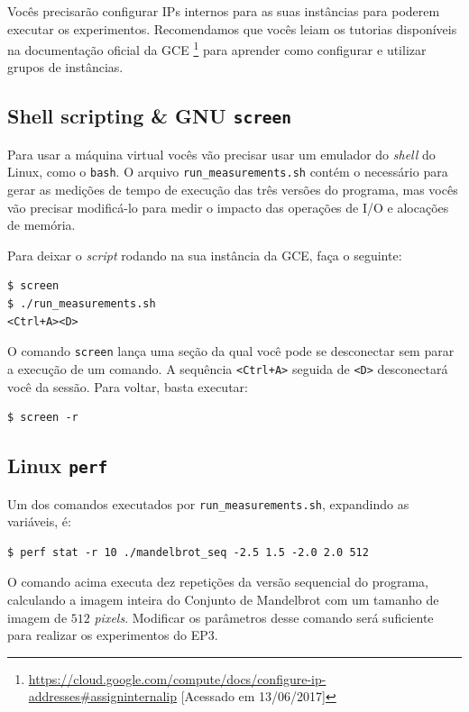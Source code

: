 \documentclass[final,12pt,a4paper]{elsarticle}
\begin{document}
Vocês precisarão configurar IPs internos para as suas instâncias para poderem
executar os experimentos. Recomendamos que vocês leiam os tutorias disponíveis
na documentação oficial da GCE
\footnote{\url{https://cloud.google.com/compute/docs/configure-ip-addresses#assigninternalip}
[Acessado em 13/06/2017]} para aprender como configurar e utilizar grupos de
instâncias.

\subsection{Shell scripting \& GNU \texttt{screen}}

Para usar a máquina virtual vocês vão precisar usar um emulador do
\textit{shell} do Linux, como o \texttt{bash}.  O arquivo
\texttt{run\_measurements.sh} contém o necessário para gerar as medições de tempo
de execução das três versões do programa, mas vocês vão precisar modificá-lo
para medir o impacto das operações de I/O e alocações de memória.

Para deixar o \textit{script} rodando na sua instância da GCE, faça o seguinte:

\begin{lstlisting}
$ screen
$ ./run_measurements.sh
<Ctrl+A><D>
\end{lstlisting}

O comando \texttt{screen} lança uma seção da qual você pode se desconectar sem
parar a execução de um comando. A sequência \texttt{<Ctrl+A>} seguida de
\texttt{<D>} desconectará você da sessão. Para voltar, basta executar:

\begin{lstlisting}
$ screen -r
\end{lstlisting}

\subsection{Linux \texttt{perf}}

Um dos comandos executados por \texttt{run\_measurements.sh}, expandindo as
variáveis, é:

\begin{lstlisting}
$ perf stat -r 10 ./mandelbrot_seq -2.5 1.5 -2.0 2.0 512
\end{lstlisting}

O comando acima executa dez repetições da versão sequencial do programa,
calculando a imagem inteira do Conjunto de Mandelbrot com um tamanho de imagem
de $512$ \textit{pixels}. Modificar os parâmetros desse comando será suficiente
para realizar os experimentos do EP3.
\end{document}
